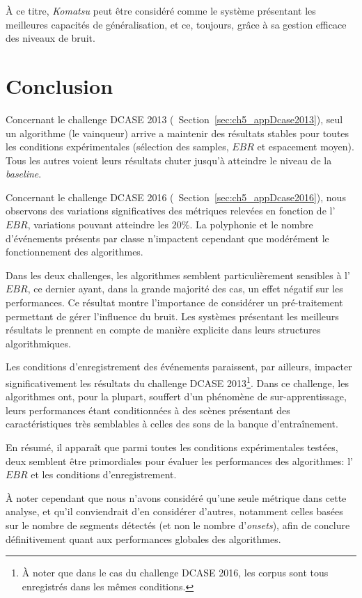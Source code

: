 À ce titre, \emph{Komatsu} peut être considéré comme le système présentant les meilleures capacités de généralisation, et ce, toujours, grâce à sa gestion efficace des niveaux de bruit.

\section{Conclusion}

Concernant le challenge DCASE 2013 (\cf~Section~\ref{sec:ch5_appDcase2013}), seul un algorithme (le vainqueur) arrive a maintenir des résultats stables pour toutes les conditions expérimentales (sélection des samples, $EBR$ et espacement moyen). Tous les autres voient leurs résultats chuter jusqu'à atteindre le niveau de la \emph{baseline}.

Concernant le challenge DCASE 2016 (\cf~Section~\ref{sec:ch5_appDcase2016}), nous observons des variations significatives des métriques relevées en fonction de l'$EBR$, variations pouvant atteindre les $20\%$. La polyphonie et le nombre d'événements présents par classe n'impactent cependant que modérément le fonctionnement des algorithmes.

Dans les deux challenges, les algorithmes semblent particulièrement sensibles à l'$EBR$, ce dernier ayant, dans la grande majorité des cas, un effet négatif sur les performances. Ce résultat montre l'importance de considérer un pré-traitement permettant de gérer l'influence du bruit. Les systèmes présentant les meilleurs résultats le prennent en compte de manière explicite dans leurs structures algorithmiques.

Les conditions d'enregistrement des événements paraissent, par ailleurs, impacter significativement les résultats du challenge DCASE 2013\footnote{À noter que dans le cas du challenge DCASE 2016, les corpus sont tous enregistrés dans les mêmes conditions.}. Dans ce challenge, les algorithmes ont, pour la plupart, souffert d'un phénomène de sur-apprentissage, leurs performances étant conditionnées à des scènes présentant des caractéristiques très semblables à celles des sons de la banque d’entraînement.

En résumé, il apparaît que parmi toutes les conditions expérimentales testées, deux semblent être primordiales pour évaluer
les performances des algorithmes: l'$EBR$ et les conditions d'enregistrement.

À noter cependant que nous n'avons considéré qu'une seule métrique dans cette analyse, et qu'il conviendrait d'en considérer d'autres, notamment celles basées sur le nombre de segments détectés (et non le nombre d'\emph{onsets}), afin de conclure définitivement quant aux performances globales des algorithmes.

